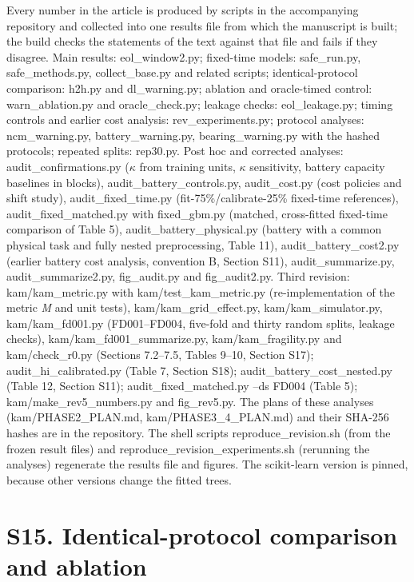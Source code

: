 \documentclass[11pt,a4paper]{article}
\begin{document}
\noindent Every number in the article is produced by scripts in the accompanying repository and collected into one results file from which the manuscript is built; the build checks the statements of the text against that file and fails if they disagree. Main results: eol\_window2.py; fixed-time models: safe\_run.py, safe\_methods.py, collect\_base.py and related scripts; identical-protocol comparison: h2h.py and dl\_warning.py; ablation and oracle-timed control: warn\_ablation.py and oracle\_check.py; leakage checks: eol\_leakage.py; timing controls and earlier cost analysis: rev\_experiments.py; protocol analyses: ncm\_warning.py, battery\_warning.py, bearing\_warning.py with the hashed protocols; repeated splits: rep30.py. Post hoc and corrected analyses: audit\_confirmations.py ($\kappa$ from training units, $\kappa$ sensitivity, battery capacity baselines in blocks), audit\_battery\_controls.py, audit\_cost.py (cost policies and shift study), audit\_fixed\_time.py (fit-75\%/calibrate-25\% fixed-time references), audit\_fixed\_matched.py with fixed\_gbm.py (matched, cross-fitted fixed-time comparison of Table 5), audit\_battery\_physical.py (battery with a common physical task and fully nested preprocessing, Table 11), audit\_battery\_cost2.py (earlier battery cost analysis, convention B, Section S11), audit\_summarize.py, audit\_summarize2.py, fig\_audit.py and fig\_audit2.py. Third revision: kam/kam\_metric.py with kam/test\_kam\_metric.py (re-implementation of the metric \textit{M} and unit tests), kam/kam\_grid\_effect.py, kam/kam\_simulator.py, kam/kam\_fd001.py (FD001--FD004, five-fold and thirty random splits, leakage checks), kam/kam\_fd001\_summarize.py, kam/kam\_fragility.py and kam/check\_r0.py (Sections 7.2--7.5, Tables 9--10, Section S17); audit\_hi\_calibrated.py (Table 7, Section S18); audit\_battery\_cost\_nested.py (Table 12, Section S11); audit\_fixed\_matched.py --ds FD004 (Table 5); kam/make\_rev5\_numbers.py and fig\_rev5.py. The plans of these analyses (kam/PHASE2\_PLAN.md, kam/PHASE3\_4\_PLAN.md) and their SHA-256 hashes are in the repository. The shell scripts reproduce\_revision.sh (from the frozen result files) and reproduce\_revision\_experiments.sh (rerunning the analyses) regenerate the results file and figures. The scikit-learn version is pinned, because other versions change the fitted trees.

\section*{S15. Identical-protocol comparison and ablation}
\end{document}
